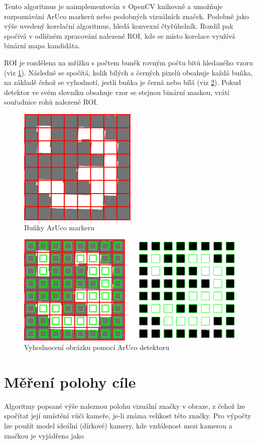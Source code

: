 \documentclass[twoside]{ctuthesis}
\theoremstyle{plain}
\theoremstyle{definition}
\theoremstyle{note}
\begin{document}
Tento algoritmus je naimplementován v OpenCV knihovně a umožňuje rozpoznávání ArUco markerů nebo podobných vizuálních značek. Podobně jako výše uvedený korelační algoritmus, hledá konvexní čtyřúhelník. Rozdíl pak spočívá v odlišném zpracování nalezené ROI, kde se místo korelace využívá binární mapa kandidáta.

ROI je rozdělena na mřížku s počtem buněk rovným počtu bitů hledaného vzoru (viz \ref{cell}). Následně se spočítá, kolik bílých a černých pixelů obsahuje každá buňka, na základě čehož se vyhodnotí, jestli buňka je černá nebo bílá (viz \ref{cellm}). Pokud detektor ve svém slovníku obsahuje vzor se stejnou binární maskou, vrátí souřadnice rohů nalezené ROI.

\begin{figure}
	\caption{Buňky ArUco markeru}
	
	\label{cell}
	\includegraphics[width=0.5\textwidth]{images/2/bitsextraction1.png}
\end{figure}
\begin{figure}
	\caption{Vyhodnocení obrázku pomocí ArUco detektoru}
	
	\label{cellm}
	\includegraphics[width=1\textwidth]{images/2/bitsextraction2.png}
\end{figure}
\section{Měření polohy cíle}
\label{mereni_polohy_cile}
Algoritmy popsané výše naleznou polohu vizuální značky v obraze, z čehož lze spočítat její umístění vůči kameře, je-li známa velikost této značky. Pro výpočty lze použít model ideální (dírkové) kamery, kde vzdálenost mezi kamerou a značkou je vyjádřena jako
\end{document}
